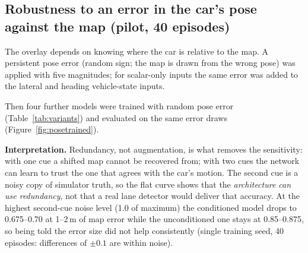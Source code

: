 \subsection{Robustness to an error in the car's pose against the map (pilot, 40 episodes)}
The overlay depends on knowing where the car is relative to the map. A persistent pose error (random sign; the map is drawn from the wrong pose) was applied with five magnitudes; for scalar-only inputs the same error was added to the lateral and heading vehicle-state inputs.

\begin{table}[H]\centering\small
\caption{Numbers for Figure~\ref{fig:localisation}.}\label{tab:localisation}
\resizebox{\textwidth}{!}{}
\end{table}
Then four further models were trained with random pose error (Table~\ref{tab:variants}) and evaluated on the same error draws (Figure~\ref{fig:posetrained}).

\textbf{Interpretation.} Redundancy, not augmentation, is what removes the sensitivity: with one cue a shifted map cannot be recovered from; with two cues the network can learn to trust the one that agrees with the car's motion. The second cue is a noisy copy of simulator truth, so the flat curve shows that the \emph{architecture can use redundancy}, not that a real lane detector would deliver that accuracy.
At the highest second-cue noise level (1.0 of maximum) the conditioned model drops to 0.675--0.70 at 1--2\,m of map error while the unconditioned one stays at 0.85--0.875, so being told the error size did not help consistently (single training seed, 40 episodes: differences of $\pm0.1$ are within noise).

